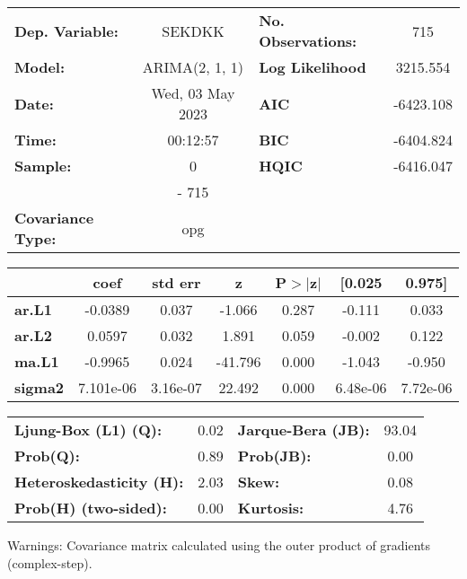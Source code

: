 \begin{center}
\begin{tabular}{lclc}
\toprule
\textbf{Dep. Variable:}          &      SEKDKK      & \textbf{  No. Observations:  } &    715      \\
\textbf{Model:}                  &  ARIMA(2, 1, 1)  & \textbf{  Log Likelihood     } &  3215.554   \\
\textbf{Date:}                   & Wed, 03 May 2023 & \textbf{  AIC                } & -6423.108   \\
\textbf{Time:}                   &     00:12:57     & \textbf{  BIC                } & -6404.824   \\
\textbf{Sample:}                 &        0         & \textbf{  HQIC               } & -6416.047   \\
\textbf{}                        &       - 715      & \textbf{                     } &             \\
\textbf{Covariance Type:}        &       opg        & \textbf{                     } &             \\
\bottomrule
\end{tabular}
\begin{tabular}{lcccccc}
                & \textbf{coef} & \textbf{std err} & \textbf{z} & \textbf{P$> |$z$|$} & \textbf{[0.025} & \textbf{0.975]}  \\
\midrule
\textbf{ar.L1}  &      -0.0389  &        0.037     &    -1.066  &         0.287        &       -0.111    &        0.033     \\
\textbf{ar.L2}  &       0.0597  &        0.032     &     1.891  &         0.059        &       -0.002    &        0.122     \\
\textbf{ma.L1}  &      -0.9965  &        0.024     &   -41.796  &         0.000        &       -1.043    &       -0.950     \\
\textbf{sigma2} &    7.101e-06  &     3.16e-07     &    22.492  &         0.000        &     6.48e-06    &     7.72e-06     \\
\bottomrule
\end{tabular}
\begin{tabular}{lclc}
\textbf{Ljung-Box (L1) (Q):}     & 0.02 & \textbf{  Jarque-Bera (JB):  } & 93.04  \\
\textbf{Prob(Q):}                & 0.89 & \textbf{  Prob(JB):          } &  0.00  \\
\textbf{Heteroskedasticity (H):} & 2.03 & \textbf{  Skew:              } &  0.08  \\
\textbf{Prob(H) (two-sided):}    & 0.00 & \textbf{  Kurtosis:          } &  4.76  \\
\bottomrule
\end{tabular}
\end{center}

Warnings: \newline
 [1] Covariance matrix calculated using the outer product of gradients (complex-step).